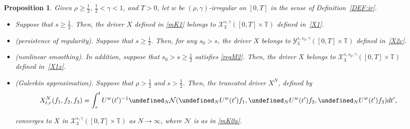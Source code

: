 \documentclass[letterpaper, 11pt,  reqno]{amsart}
\newtheorem{proposition}[theorem]{Proposition}
\newcommand{\1}{\hspace{0.5mm}\text{I}\hspace{0.5mm}}
\newcommand{\noi}{\noindent}
\newcommand{\T}{\mathbb{T}}
\let\P= \undefined
\newcommand{\P}{\mathbf{P}}
\newcommand{\g}{\gamma}
\newcommand{\NN}{\mathcal{N}}
\newcommand{\cX}{\mathcal{X}}
\newcommand{\cY}{\mathcal{Y}}
\newcommand{\uw}{U^w}
\numberwithin{equation}{section}
\numberwithin{theorem}{section}
\begin{document}
\begin{proposition}\label{PROP:mkdv1}
Given $\rho \ge\frac 12$,  $\frac 12 < \g < 1$, and $T> 0$, 
let  $w$ be $(\rho,\g)$-irregular on $[0, T]$ in the sense of Definition~\ref{DEF:ir}.


\smallskip

\begin{itemize}
\item[(i)]
Suppose that $s \ge \frac 12$. 
Then, 
the driver $X$ defined in \eqref{mK1}
belongs to $ \cX^{s, \g}_3([0, T]\times \T)$
defined in~\eqref{X1}.

\smallskip
\item[(ii)] \textup{(persistence of regularity).}
Suppose that $s \ge \frac 12$. 
Then, 
for any $s_0 > s$, 
the driver $X$ 
belongs to 
$\cY^{s, s_0, \g}_{3}([0, T]\times \T)$
defined in~\eqref{X2c}.



\smallskip
\item[(iii)]
\textup{(nonlinear smoothing).}
In addition, suppose that $s_0 > s \ge \frac 12$ satisfies
\eqref{regM2}.
Then, 
the driver $X$ 
belongs to 
$\cX^{s, s_0, \g}_{3}([0, T]\times \T)$
defined in~\eqref{X1x}.



\smallskip
\item[(iv)]
\textup{(Galerkin approximation).}
Suppose that $\rho > \frac12$ and $s > \frac 12$.
Then, 
the truncated driver $X^N$, defined by 
 \begin{align}
X_{t,r}^N(f_1,f_2, f_3)=\int_r^t  \uw(t')^{-1}
\P_N \NN( \P_N \uw(t')  f_1 ,\P_N  \uw(t') f_2, \P_N  \uw(t') f_3) dt',
\label{XN2}
\end{align}


\noi
 converges
to  $X$ 
in  $ \cX^{s, \g}_3([0, T]\times \T)$ as $N \to \infty$, 
where $\NN$ is as in \eqref{mK0a}.


\end{itemize}




\end{proposition}
\end{document}
